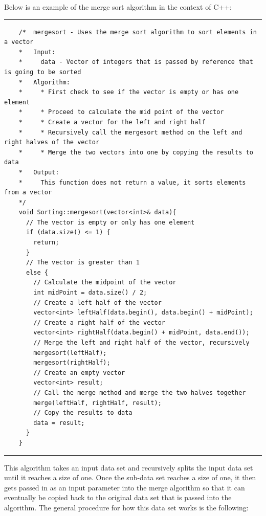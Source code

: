 \documentclass[a4paper,9pt]{article}
\newcommand{\horizontalline}{\noindent \rule{\textwidth}{0.5pt}\par}
\begin{document}
\begin{highlight}
    Below is an example of the merge sort algorithm in the context of C++:

    \horizontalline

    \begin{verbatim}
    /*  mergesort - Uses the merge sort algorithm to sort elements in a vector
    *   Input:
    *     data - Vector of integers that is passed by reference that is going to be sorted
    *   Algorithm:
    *     * First check to see if the vector is empty or has one element
    *     * Proceed to calculate the mid point of the vector
    *     * Create a vector for the left and right half
    *     * Recursively call the mergesort method on the left and right halves of the vector
    *     * Merge the two vectors into one by copying the results to data
    *   Output:
    *     This function does not return a value, it sorts elements from a vector
    */
    void Sorting::mergesort(vector<int>& data){
      // The vector is empty or only has one element
      if (data.size() <= 1) {
        return;
      }
      // The vector is greater than 1
      else {
        // Calculate the midpoint of the vector
        int midPoint = data.size() / 2;
        // Create a left half of the vector
        vector<int> leftHalf(data.begin(), data.begin() + midPoint);
        // Create a right half of the vector
        vector<int> rightHalf(data.begin() + midPoint, data.end());
        // Merge the left and right half of the vector, recursively
        mergesort(leftHalf);
        mergesort(rightHalf);
        // Create an empty vector
        vector<int> result;
        // Call the merge method and merge the two halves together
        merge(leftHalf, rightHalf, result);
        // Copy the results to data
        data = result;
      }
    }
    \end{verbatim}

    \horizontalline

    This algorithm takes an input data set and recursively splits the input data set until it reaches a size of one. Once the sub-data set reaches a size of one, it then gets passed in as an input parameter into the merge algorithm so that it can eventually be copied back to the original data set that is passed into the algorithm. The general procedure for how this data set works is the following:


\end{highlight}
\end{document}
